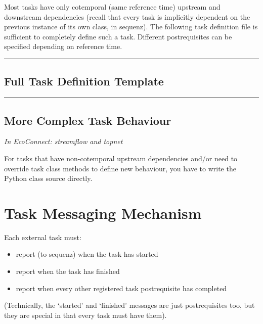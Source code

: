 \documentclass[11pt,a4paper]{article}
\begin{document}
Most tasks have only cotemporal (same reference time) upstream and
downstream dependencies (recall that every task is implicitly dependent
on the previous instance of its own class, in sequenz). The following
task definition file is sufficient to completely define such a task.
Different postrequisites can be specified depending on reference time. 

\lstset{language=sh, numbers=left}

{\tiny
\noindent
\rule{5cm}{.2mm}

}

\subsection{Full Task Definition Template}

\lstset{language=sh, numbers=left}

{\tiny
\noindent
\rule{5cm}{.2mm}

}

\subsection{More Complex Task Behaviour}

\textit{In EcoConnect: streamflow and topnet}

For tasks that have non-cotemporal upstream dependencies and/or need to  
override task class methods to define new behaviour, you have to 
write the Python class source directly. 

\section{Task Messaging Mechanism}

Each external task must:

\begin{itemize}
\item report (to sequenz) when the task has started
\item report when the task has finished
\item report when every other registered task postrequisite has
completed
\end{itemize}

(Technically, the `started' and `finished' messages are just
postrequisites too, but they are special in that every task
must have them).
\end{document}
